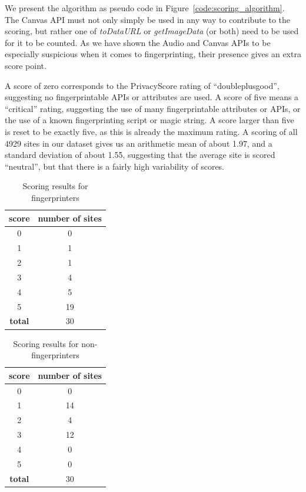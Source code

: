 \documentclass[
    fontsize=12pt,
    headings=small,
    parskip=half,
    bibliography=totoc,
    numbers=noenddot,
    open=any
    ]{scrreprt}
\begin{document}
We present the algorithm as pseudo code in Figure~\ref{code:scoring_algorithm}.
The Canvas API must not only simply be used in any way to contribute
to the scoring, but rather one of \textit{toDataURL} or \textit{getImageData} (or both) need to be used
for it to be counted. As we have shown the Audio and Canvas APIs to be especially suspicious
when it comes to fingerprinting, their presence gives an extra score point.

A score of zero corresponds to the PrivacyScore rating of ``doubleplusgood'', suggesting
no fingerprintable APIs or attributes are used. A score of five means a ``critical'' rating,
suggesting the use of many fingerprintable attributes or APIs, or the use of a known fingerprinting
script or magic string. A score larger than five is reset to be exactly five, as this is already
the maximum rating.
A scoring of all 4929 sites in our dataset gives us an arithmetic mean of
about 1.97, and a standard deviation of about 1.55, suggesting that the average site
is scored ``neutral'', but that there is a fairly high variability of scores.

\begin{table}
\centering
\caption{Scoring results for fingerprinters}
\begin{tabular}{c c}
    \toprule
    \textbf{score} & \textbf{number of sites} \\
    \midrule
    0 & 0 \\
    1 & 1 \\
    2 & 1 \\
    3 & 4 \\
    4 & 5 \\
    5 & 19 \\
    \midrule
    \textbf{total} & 30 \\
    \bottomrule
\end{tabular}
\label{table:scoring_results_fp}
\end{table}

\begin{table}
\centering
\caption{Scoring results for non-fingerprinters}
\begin{tabular}{c c}
    \toprule
    \textbf{score} & \textbf{number of sites} \\
    \midrule
    0 & 0 \\
    1 & 14 \\
    2 & 4 \\
    3 & 12 \\
    4 & 0 \\
    5 & 0 \\
    \midrule
    \textbf{total} & 30 \\
    \bottomrule
\end{tabular}
\label{table:scoring_results_nonfp}
\end{table}
\end{document}
